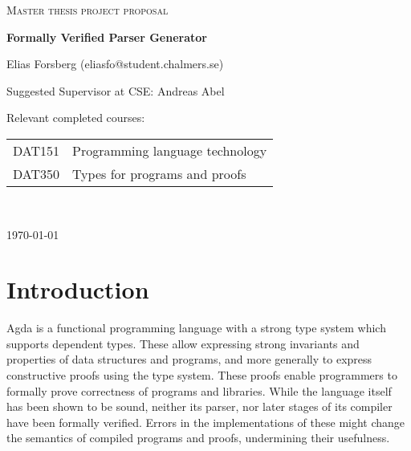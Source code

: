 \documentclass{article}
\begin{document}
\begin{titlepage}
  

\centering
  
  
{\scshape\LARGE Master thesis project proposal\\}
  
\vspace{0.5cm}
  
{\huge\bfseries Formally Verified Parser Generator\\}
  
\vspace{2cm}
  
{\Large Elias Forsberg (eliasfo@student.chalmers.se)\\}
  
\vspace{1.0cm}
  
{\large Suggested Supervisor at CSE: Andreas Abel\\}
  
\vspace{1.5cm}
  
{\large Relevant completed courses:\par}
  
{\itshape %
	\begin{tabular}{cl}
		DAT151 & Programming language technology \\
		DAT350 & Types for programs and proofs \\
	\end{tabular} \\
}
\vfill

\vfill
  
{\large \today\\} 

\end{titlepage}

\section{Introduction}


	Agda is a functional programming language with a strong type system which
	supports dependent types. These allow expressing strong invariants and
	properties of data structures and programs, and more generally to express
	constructive proofs using the type system. These proofs enable programmers
	to formally prove correctness of programs and libraries. While the language
	itself has been shown to be sound, neither its parser, nor later stages of
	its compiler have been formally verified. Errors in the implementations of
	these might change the semantics of compiled programs and proofs,
	undermining their usefulness.
\end{document}
